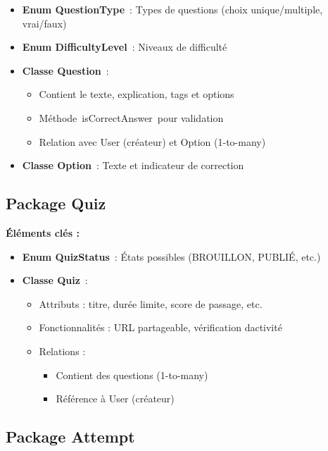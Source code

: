 \documentclass[12pt,a4paper,twoside]{report}
\begin{document}
\begin{itemize}
\item
  \textbf{Enum QuestionType}~: Types de questions (choix
  unique/multiple, vrai/faux)
\item
  \textbf{Enum DifficultyLevel}~: Niveaux de difficulté
\item
  \textbf{Classe Question}~:

  \begin{itemize}
  \item
    Contient le texte, explication, tags et options
  \item
    Méthode~isCorrectAnswer~pour validation
  \item
    Relation avec User (créateur) et Option (1-to-many)
  \end{itemize}
\item
  \textbf{Classe Option}~: Texte et indicateur de correction
\end{itemize}

\hypertarget{package-quiz}{%
\subsection{Package Quiz}\label{package-quiz}}

\textbf{Éléments clés :}

\begin{itemize}
\item
  \textbf{Enum QuizStatus}~: États possibles (BROUILLON, PUBLIÉ, etc.)
\item
  \textbf{Classe Quiz}~:

  \begin{itemize}
  \item
    Attributs : titre, durée limite, score de passage, etc.
  \item
    Fonctionnalités : URL partageable, vérification
    d\textquotesingle activité
  \item
    Relations :

    \begin{itemize}
    \item
      Contient des questions (1-to-many)
    \item
      Référence à User (créateur)
    \end{itemize}
  \end{itemize}
\end{itemize}

\hypertarget{package-attempt}{%
\subsection{Package Attempt}\label{package-attempt}}
\end{document}
